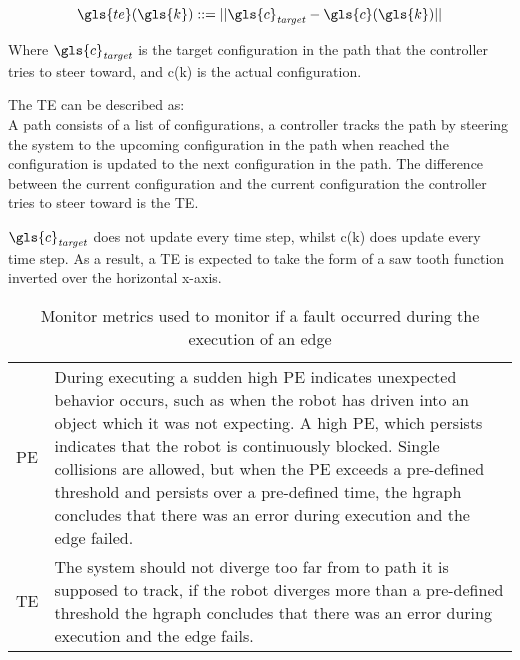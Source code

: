 \[ \gls{te}(\gls{k}) ::= ||\gls{c}_\mathit{target} - \gls{c}(\gls{k})|| \]

Where $\gls{c}_\mathit{target}$ is the target configuration in the path that the controller tries to steer toward, and \gls{c}(\gls{k}) is the actual configuration.\bs

The \ac{TE} can be described as:\\ A path consists of a list of configurations, a controller tracks the path by steering the system to the upcoming configuration in the path when reached the configuration is updated to the next configuration in the path. The difference between the current configuration and the current configuration the controller tries to steer toward is the \ac{TE}.\bs

$\gls{c}_\mathit{target}$ does not update every time step, whilst \gls{c}(\gls{k}) does update every time step. As a result, a  \ac{TE} is expected to take the form of a saw tooth function inverted over the horizontal x-axis.\bs

\noindent
\begin{table}[H]
\centering
\begin{tabular}%
  {>{\raggedleft\arraybackslash}p{}%
   >{\raggedright\arraybackslash}p{}}
\acf{PE}&  During executing a sudden high \ac{PE} indicates unexpected behavior occurs, such as when the robot has driven into an object which it was not expecting. A high \ac{PE}, which persists indicates that the robot is continuously blocked. Single collisions are allowed, but when the \ac{PE} exceeds a pre-defined threshold and persists over a pre-defined time, the \ac{hgraph} concludes that there was an error during execution and the edge failed.\\
  \acf{TE}& The system should not diverge too far from to path it is supposed to track, if the robot diverges more than a pre-defined threshold the \ac{hgraph} concludes that there was an error during execution and the edge fails. \\
\end{tabular}
\caption{Monitor metrics used to monitor if a fault occurred during the execution of an edge}%
\label{table:monitoring_edge_metrics}
\end{table}
